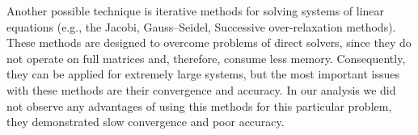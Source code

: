 Another possible technique is iterative methods for solving systems of linear equations (e.g., the Jacobi, Gauss–Seidel, Successive over-relaxation methods). These methods are designed to overcome problems of direct solvers, since they do not operate on full matrices and, therefore, consume less memory. Consequently, they can be applied for extremely large systems, but the most important issues with these methods are their convergence and accuracy. In our analysis we did not observe any advantages of using this methods for this particular problem, they demonstrated slow convergence and poor accuracy.
